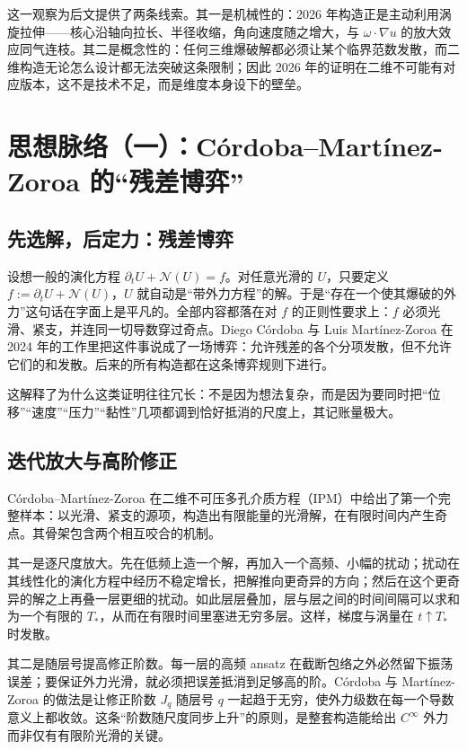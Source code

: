 这一观察为后文提供了两条线索。其一是机械性的：2026 年构造正是主动利用涡旋拉伸——核心沿轴向拉长、半径收缩，角向速度随之增大，与 $\omega\cdot\nabla u$ 的放大效应同气连枝。其二是概念性的：任何三维爆破解都必须让某个临界范数发散，而二维构造无论怎么设计都无法突破这条限制；因此 2026 年的证明在二维不可能有对应版本，这不是技术不足，而是维度本身设下的壁垒。

\section{思想脉络（一）：Córdoba--Martínez-Zoroa 的“残差博弈”}

\subsection{先选解，后定力：残差博弈}

设想一般的演化方程 $\partial_{t}U+\mathcal{N}(U)=f$。对任意光滑的 $U$，只要定义 $f:=\partial_{t}U+\mathcal{N}(U)$，$U$ 就自动是“带外力方程”的解。于是“存在一个使其爆破的外力”这句话在字面上是平凡的。全部内容都落在对 $f$ 的正则性要求上：$f$ 必须光滑、紧支，并连同一切导数穿过奇点。Diego Córdoba 与 Luis Martínez-Zoroa 在 2024 年的工作\cite{cmz-ipm}里把这件事说成了一场博弈：允许残差的各个分项发散，但不允许它们的和发散。后来的所有构造都在这条博弈规则下进行。

这解释了为什么这类证明往往冗长：不是因为想法复杂，而是因为要同时把“位移”“速度”“压力”“黏性”几项都调到恰好抵消的尺度上，其记账量极大。

\subsection{迭代放大与高阶修正}

Córdoba--Martínez-Zoroa 在二维不可压多孔介质方程（IPM）中给出了第一个完整样本\cite{cmz-ipm}：以光滑、紧支的源项，构造出有限能量的光滑解，在有限时间内产生奇点。其骨架包含两个相互咬合的机制。

其一是逐尺度放大。先在低频上造一个解，再加入一个高频、小幅的扰动；扰动在其线性化的演化方程中经历不稳定增长，把解推向更奇异的方向；然后在这个更奇异的解之上再叠一层更细的扰动。如此层层叠加，层与层之间的时间间隔可以求和为一个有限的 $T_{*}$，从而在有限时间里塞进无穷多层。这样，梯度与涡量在 $t\uparrow T_{*}$ 时发散。

其二是随层号提高修正阶数。每一层的高频 ansatz 在截断包络之外必然留下振荡误差；要保证外力光滑，就必须把误差抵消到足够高的阶。Córdoba 与 Martínez-Zoroa 的做法是让修正阶数 $J_{q}$ 随层号 $q$ 一起趋于无穷，使外力级数在每一个导数意义上都收敛。这条“阶数随尺度同步上升”的原则，是整套构造能给出 $C^{\infty}$ 外力而非仅有有限阶光滑的关键。

